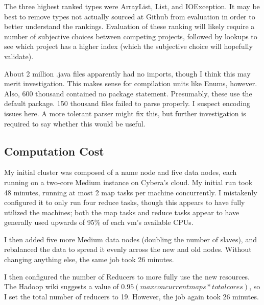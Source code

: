 \documentclass{article}
\begin{document}
The three highest ranked types were ArrayList, List, and IOException. It may be best to remove types not actually sourced at Github from evaluation in order to better understand the rankings. Evaluation of these ranking will likely require a number of subjective choices between competing projects, followed by lookups to see which project has a higher index (which the subjective choice will hopefully validate).

About 2 million .java files apparently had no imports, though I think this may merit investigation. This makes sense for compilation units like Enums, however. Also, 600 thousand contained no package statement. Presumably, these use the default package. 150 thousand files failed to parse properly. I suspect encoding issues here. A more tolerant parser might fix this, but further investigation is required to say whether this would be useful.

\subsection{Computation Cost}

My initial cluster was composed of a name node and five data nodes, each running on a two-core Medium instance on Cybera's cloud. My initial run took 48 minutes, running at most 2 map tasks per machine concurrently. I mistakenly configured it to only run four reduce tasks, though this appears to have fully utilized the machines; both the map tasks and reduce tasks appear to have generally used upwards of 95\% of each vm's available CPUs.

I then added five more Medium data nodes (doubling the number of slaves), and rebalanced the data to spread it evenly across the new and old nodes. Without changing anything else, the same job took 26 minutes.

I then configured the number of Reducers to more fully use the new resources. The Hadoop wiki suggests a value of $0.95 (max concurrent maps * total cores)$, so I set the total number of reducers to 19. However, the job again took 26 minutes.
\end{document}
